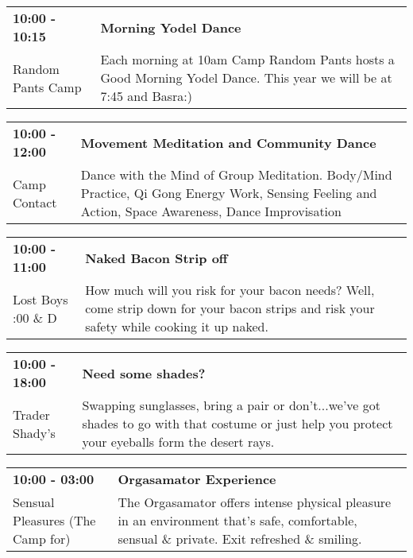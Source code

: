 \begin{tabular}{ p{1in} p{2.2in} }
    \textbf{10:00 - 10:15} & \textbf{Morning Yodel Dance} \\
    Random Pants Camp \newline  & Each morning at 10am Camp Random Pants hosts a Good Morning Yodel Dance. This year we will be at 7:45 and Basra:) \\
    \hline 
\end{tabular}
    
\begin{tabular}{ p{1in} p{2.2in} }
    \textbf{10:00 - 12:00} & \textbf{Movement Meditation and Community Dance} \\
    Camp Contact \newline  & Dance with the Mind of Group Meditation. Body/Mind Practice, Qi Gong Energy Work, Sensing Feeling and Action, Space Awareness, Dance Improvisation \\
    \hline 
\end{tabular}
    
\begin{tabular}{ p{1in} p{2.2in} }
    \textbf{10:00 - 11:00} & \textbf{Naked Bacon Strip off} \\
    Lost Boys \newline 4:00 \& D & How much will you risk for your bacon needs? Well, come strip down for your bacon strips and risk your safety while cooking it up naked. \\
    \hline 
\end{tabular}
    
\begin{tabular}{ p{1in} p{2.2in} }
    \textbf{10:00 - 18:00} & \textbf{Need some shades?} \\
    Trader Shady's \newline  & Swapping sunglasses, bring a pair or don't...we've got shades to go with that costume or just help you protect your eyeballs form the desert rays. \\
    \hline 
\end{tabular}
    
\begin{tabular}{ p{1in} p{2.2in} }
    \textbf{10:00 - 03:00} & \textbf{Orgasamator Experience} \\
    Sensual Pleasures (The Camp for) \newline  & The Orgasamator offers intense physical pleasure in an environment that's safe, comfortable, sensual \& private.  Exit refreshed \& smiling. \\
    \hline 
\end{tabular}
    
